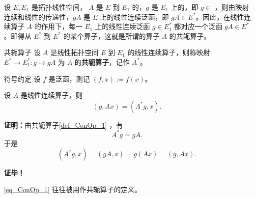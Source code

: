 

设 $E,E_1$ 是拓扑线性空间， $A$ 是 $E$ 到 $E_1$ 的，$g$ 是 $E_1$ 上的，即 $g\in$ ，则由映射连续和线性的传递性，$gA$ 是 $E$ 上的线性连续泛函，即 $gA\in E^*$。因此，在线性连续算子 $A$ 的作用下，每一 $E_1$ 上的线性连续泛函 $g\in E_1^*$ 都对应一个泛函 $gA\in E^*$。即得从 $E_1^*$ 到 $E^*$ 的某个算子，这就是所谓的算子 $A$ 的共轭算子。

\begin{definition}{共轭算子}\label{def_ConOp_1}
设 $A$ 是线性拓扑空间 $E$ 到 $E_1$ 的线性连续算子，则称映射 $E^*\rightarrow  E_1^*:g\mapsto gA$ 为 $A$ 的\textbf{共轭算子}，记作 $A^*$。
\end{definition}

\begin{definition}{符号约定}
设 $f$ 是泛函，则记 $(f,x):=f(x)$。
\end{definition}

\begin{theorem}{}
设 $A$ 是线性连续算子，则
\begin{equation}\label{eq_ConOp_1}
(g,Ax)=(A^* g,x).~
\end{equation}
\end{theorem}

\textbf{证明：}由共轭算子\autoref{def_ConOp_1} ，有
\begin{equation}
A^*g=gA.~
\end{equation}
于是 
\begin{equation}
(A^*g,x)=(gA,x)=g(Ax)=(g,Ax).~
\end{equation}

\textbf{证毕！}
 
 
\autoref{eq_ConOp_1} 往往被用作共轭算子的定义。



